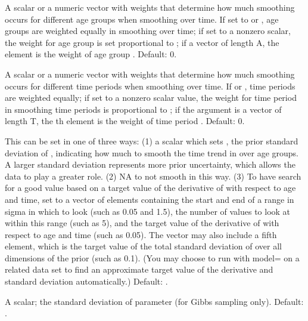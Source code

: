 \begin{Arguments}
\begin{ldescription}
\item[\code{Ht.age.weight}] A scalar or a numeric vector with weights that
determine how much smoothing occurs for different age groups when
smoothing over time. If set to  or , age groups are weighted
equally in smoothing over time; if set to a nonzero scalar, the
weight for age group  is set proportional to ;
if a vector of length A, the  element is the weight of age
group . Default: 0.

\item[\code{Ht.time.weight}] A scalar or a numeric vector with weights that
determine how much smoothing occurs for different time periods when
smoothing over time. If  or , time periods are weighted equally;
if set to a nonzero scalar value, the weight for time period  in
smoothing time periods is proportional to ; if
the argument is a vector of length T, the th element is the
weight of time period . Default: 0.

\item[\code{Hat.sigma}] This can be set in one of three ways: (1) a
scalar which sets , the prior standard deviation
of , indicating how much to smooth the time trend in  over
age groups. A larger standard deviation represents more prior
uncertainty, which allows the data to play a greater role. (2) NA to
not smooth in this way. (3) To have  search for a good value
based on a target value of the derivative of  with respect to
age and time, set to a vector of elements containing the start and
end of a range in sigma in which to look (such as 0.05 and 1.5), the
number of values to look at within this range (such as 5), and the
target value of the derivative of  with respect to age and
time (such as 0.05). The vector may also include a fifth element,
which is the target value of the total standard deviation of 
over all dimensions of the prior (such as 0.1). (You may choose to
run  with model= on a related data set to find an
approximate target value of the derivative and standard deviation
automatically.) Default: . 

\item[\code{Hat.sigma.sd}] A scalar; the standard deviation of parameter
 (for Gibbs sampling only). Default: .


\end{ldescription}
\end{Arguments}
